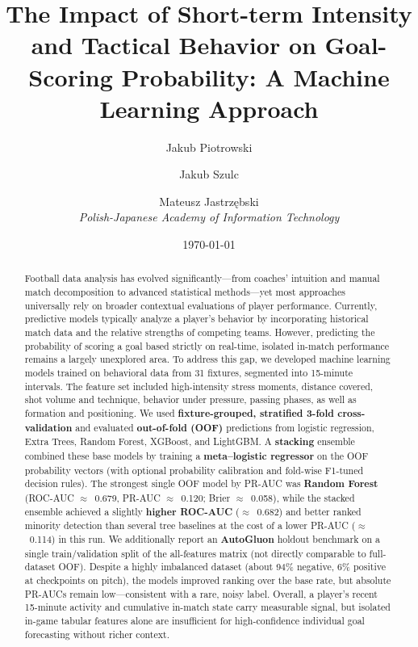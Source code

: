 \documentclass[11pt, a4paper]{article}
\title{The Impact of Short-term Intensity and Tactical Behavior on Goal-Scoring Probability: A Machine Learning Approach}
\author{
    Jakub Piotrowski \and Jakub Szulc \and Mateusz Jastrzębski \\
    \vspace{0.2cm}
    \textit{Polish-Japanese Academy of Information Technology}
}
\date{\today}
\begin{document}
\maketitle

\begin{abstract}
Football data analysis has evolved significantly—from coaches' intuition and manual match decomposition to advanced statistical methods—yet most approaches universally rely on broader contextual evaluations of player performance. Currently, predictive models typically analyze a player's behavior by incorporating historical match data and the relative strengths of competing teams. However, predicting the probability of scoring a goal based strictly on real-time, isolated in-match performance remains a largely unexplored area. To address this gap, we developed machine learning models trained on behavioral data from 31 fixtures, segmented into 15-minute intervals. The feature set included high-intensity stress moments, distance covered, shot volume and technique, behavior under pressure, passing phases, as well as formation and positioning. We used \textbf{fixture-grouped, stratified 3-fold cross-validation} and evaluated \textbf{out-of-fold (OOF)} predictions from logistic regression, Extra Trees, Random Forest, XGBoost, and LightGBM. A \textbf{stacking} ensemble combined these base models by training a \textbf{meta--logistic regressor} on the OOF probability vectors (with optional probability calibration and fold-wise F1-tuned decision rules). The strongest single OOF model by PR-AUC was \textbf{Random Forest} (ROC-AUC $\approx$~0.679, PR-AUC $\approx$~0.120; Brier $\approx$~0.058), while the stacked ensemble achieved a slightly \textbf{higher ROC-AUC} ($\approx$~0.682) and better ranked minority detection than several tree baselines at the cost of a lower PR-AUC ($\approx$~0.114) in this run. We additionally report an \textbf{AutoGluon} holdout benchmark on a single train/validation split of the all-features matrix (not directly comparable to full-dataset OOF). Despite a highly imbalanced dataset (about 94\% negative, 6\% positive at checkpoints on pitch), the models improved ranking over the base rate, but absolute PR-AUCs remain low---consistent with a rare, noisy label. Overall, a player's recent 15-minute activity and cumulative in-match state carry measurable signal, but isolated in-game tabular features alone are insufficient for high-confidence individual goal forecasting without richer context.
\end{abstract}
\end{document}
